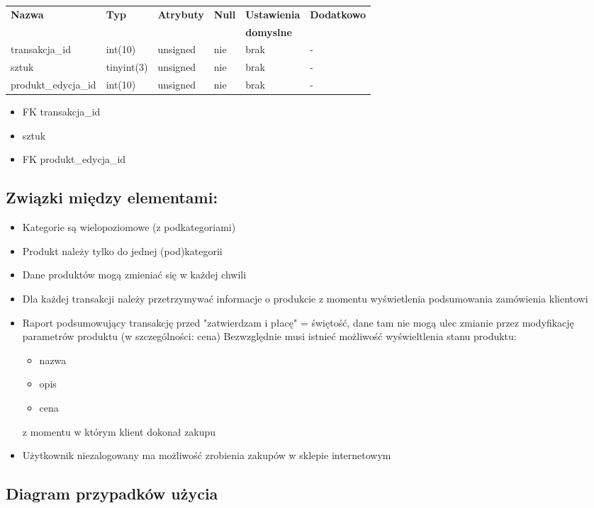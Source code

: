 \begin{enumerate}
\begin{tabular}{|l|l|l|l|l|l|} \hline
	\textbf{Nazwa} & \textbf{Typ} & \textbf{Atrybuty} & \textbf{Null} & \textbf{Ustawienia} & \textbf{Dodatkowo} \\
	&&&&\textbf{domyslne}&\\
	\hline
	transakcja\_id&int(10)&unsigned&nie&brak&-\\
	sztuk&tinyint(3)&unsigned&nie&brak&-\\
	produkt\_edycja\_id&int(10)&unsigned&nie&brak&-\\
	\hline
	
\end{tabular}
\begin{itemize}
	\item FK transakcja\_id
	\item sztuk
	\item FK produkt\_edycja\_id
\end{itemize}
\end{enumerate}


\subsection{Związki między elementami:}
\begin{itemize}
\item Kategorie są wielopoziomowe (z podkategoriami)
\item Produkt należy tylko do jednej (pod)kategorii
\item Dane produktów mogą zmieniać się w każdej chwili
\item Dla każdej transakcji należy przetrzymywać informacje o produkcie z momentu wyświetlenia podsumowania zamówienia klientowi
\item Raport podsumowujący transakcję przed "zatwierdzam i płacę" = świętość, dane tam nie mogą ulec zmianie przez modyfikację parametrów produktu (w szczególności: cena)
Bezwzględnie musi istnieć możliwość wyświeltlenia stanu produktu:
\begin{itemize}
	\item nazwa
	\item opis
	\item cena
\end{itemize}
z momentu  w którym klient dokonał zakupu
\item Użytkownik niezalogowany ma możliwość zrobienia zakupów w sklepie internetowym
\end{itemize}

\subsection{Diagram przypadków użycia}

